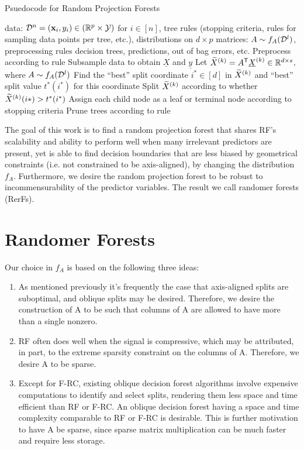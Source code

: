 \documentclass{article}
\begin{document}
\begin{algorithm}
  \caption{Psuedocode for Random Projection Forests}
  \label{pseudo}
\begin{algorithmic}[1]
  data: $\mathcal{D}^n = (\mathbf{x}_i,y_i) \in (\mathbb{R}^p \times \mathcal{Y})$ for $i \in [n]$, tree rules (stopping criteria, rules for sampling data points per tree, etc.), distributions on $d \times p$ matrices: $A \sim f_A(\mathcal{D}^l)$, preprocessing rules
  decision trees, predictions, out of bag errors, etc.
  \STATEx
  \STATE Preprocess according to rule
  \STATE Subsample data to obtain $\underline{X}$ and $\underline{y}$
  \STATE Let $\widetilde{X}^{(k)} =  A^{\mathsf{T}} \underline{X}^{(k)} \in \mathbb{R}^{d \times s}$, where $A \sim f_A(\mathcal{D}^l)$
  \STATE Find the ``best'' split coordinate $i^* \in [d]$ in $\widetilde{X}^{(k)}$ and ``best'' split value $t^*(i^*)$ for this coordinate
  \STATE Split $\widetilde{X}^{(k)}$ according to whether $\widetilde{X}^{(k)}(i*) > t^*(i^*)$
  \STATE Assign each child node as a leaf or terminal  node according to stopping criteria
  \ENDFOR
  \ENDFOR
  \STATE Prune trees according to rule
\end{algorithmic}
\end{algorithm}

The goal of this work is to find a random projection forest that shares RF's scalability and ability to perform well when many irrelevant predictors are present, yet is able to find decision boundaries that are less biased by geometrical constraints (i.e. not constrained to be axis-aligned), by changing the distribution $f_A$. Furthermore, we desire the random projection forest to be robust to incommensurability of the predictor variables. The result we call randomer forests (RerFs).

\section{Randomer Forests}

Our choice in $f_A$ is based on the following three ideas:
\begin{enumerate}
  \item As mentioned previously it's frequently the case that axis-aligned splits are suboptimal, and oblique splits may be desired. Therefore, we desire the construction of A to be such that columns of A are allowed to have more than a single nonzero.
  \item RF often does well when the signal is compressive, which may be attributed, in part, to the extreme sparsity constraint on the columns of A. Therefore, we desire A to be sparse.
  \item Except for F-RC, existing oblique decision forest algorithms involve expensive computations to identify and select splits, rendering them less space and time efficient than RF or F-RC. An oblique decision forest having a space and time complexity comparable to RF or F-RC is desirable. This is further motivation to have A be sparse, since sparse matrix multiplication can be much faster and require less storage.
\end{enumerate}
\end{document}
